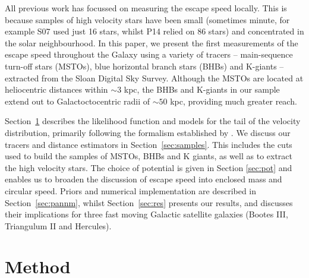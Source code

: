 \documentclass[useAMS,twocolumn,usenatbib]{mn2e}
\begin{document}
All previous work has focussed on measuring the escape speed locally. 
This is because samples of high velocity stars have been small (sometimes minute, for example S07 used just 16 stars, whilst P14 relied on 86 stars) and concentrated in the solar neighbourhood.
In this paper, we present the first measurements of the escape speed throughout the Galaxy using a variety of tracers -- main-sequence turn-off stars (MSTOs), blue horizontal branch stars (BHBs) and K-giants -- extracted from the Sloan Digital Sky Survey.
Although the MSTOs are located at heliocentric distances within $\sim 3$ kpc, the BHBs and K-giants in our sample extend out to Galactoctocentric radii of $\sim 50$ kpc, providing much greater reach.

Section~\ref{sec:method} describes the likelihood function and models for the tail of the velocity distribution, primarily following the formalism established by \citet{Le90}. 
We discuss our tracers and distance estimators in Section~\ref{sec:samples}. 
This includes the cuts used to build the samples of MSTOs, BHBs and K giants, as well as to extract the high velocity stars. 
The choice of potential is given in Section \ref{sec:pot} and enables us to broaden the discussion of escape speed into enclosed mass and circular speed. 
Priors and numerical implementation are described in Section~\ref{sec:pannm}, whilst Section~\ref{sec:res} presents our results, and discusses their implications for three fast moving Galactic satellite galaxies (Bootes III, Triangulum II and Hercules).

\section{Method}

\label{sec:method}

\end{document}
